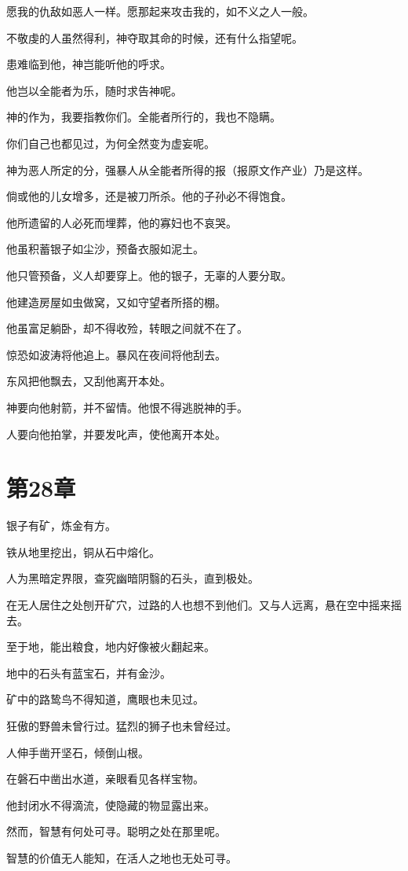 \documentclass[12pt,oneside]{book}
\begin{document}
愿我的仇敌如恶人一样。愿那起来攻击我的，如不义之人一般。

不敬虔的人虽然得利，神夺取其命的时候，还有什么指望呢。

患难临到他，神岂能听他的呼求。

他岂以全能者为乐，随时求告神呢。

神的作为，我要指教你们。全能者所行的，我也不隐瞒。

你们自己也都见过，为何全然变为虚妄呢。

神为恶人所定的分，强暴人从全能者所得的报（报原文作产业）乃是这样。

倘或他的儿女增多，还是被刀所杀。他的子孙必不得饱食。

他所遗留的人必死而埋葬，他的寡妇也不哀哭。

他虽积蓄银子如尘沙，预备衣服如泥土。

他只管预备，义人却要穿上。他的银子，无辜的人要分取。

他建造房屋如虫做窝，又如守望者所搭的棚。

他虽富足躺卧，却不得收殓，转眼之间就不在了。

惊恐如波涛将他追上。暴风在夜间将他刮去。

东风把他飘去，又刮他离开本处。

神要向他射箭，并不留情。他恨不得逃脱神的手。

人要向他拍掌，并要发叱声，使他离开本处。


\chapter{第28章}
银子有矿，炼金有方。

铁从地里挖出，铜从石中熔化。

人为黑暗定界限，查究幽暗阴翳的石头，直到极处。

在无人居住之处刨开矿穴，过路的人也想不到他们。又与人远离，悬在空中摇来摇去。

至于地，能出粮食，地内好像被火翻起来。

地中的石头有蓝宝石，并有金沙。

矿中的路鸷鸟不得知道，鹰眼也未见过。

狂傲的野兽未曾行过。猛烈的狮子也未曾经过。

人伸手凿开坚石，倾倒山根。

在磐石中凿出水道，亲眼看见各样宝物。

他封闭水不得滴流，使隐藏的物显露出来。

然而，智慧有何处可寻。聪明之处在那里呢。

智慧的价值无人能知，在活人之地也无处可寻。
\end{document}
